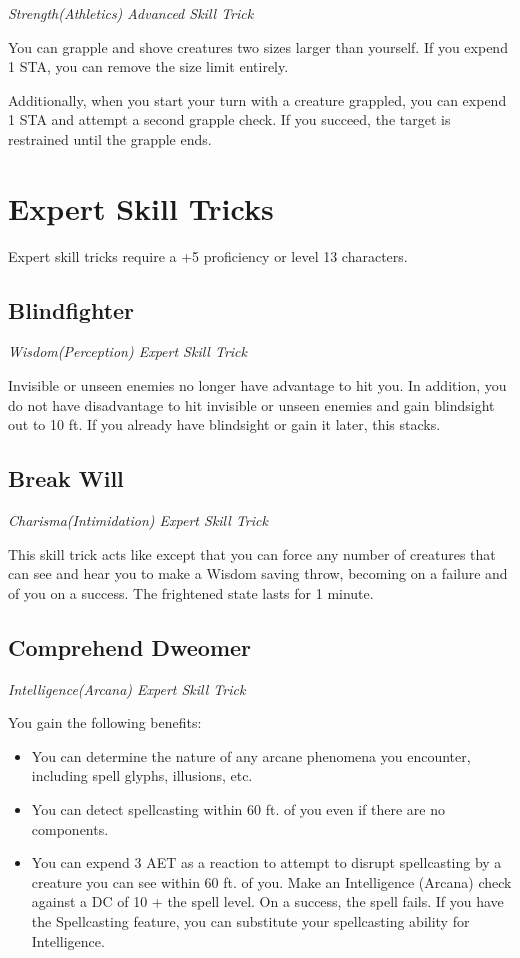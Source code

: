 \textit{Strength(Athletics) Advanced Skill Trick}

You can grapple and shove creatures two sizes larger than yourself. If you expend 1 STA, you can remove the size limit entirely.

Additionally, when you start your turn with a creature grappled, you can expend 1 STA and attempt a second grapple check. If you succeed, the target is restrained until the grapple ends.

\section{Expert Skill Tricks}
\label{sec:skill-tricks-expert}

Expert skill tricks require a +5 proficiency or level 13 characters.

\subsection{Blindfighter}

\textit{Wisdom(Perception) Expert Skill Trick}

Invisible or unseen enemies no longer have advantage to hit you. In addition, you do not have disadvantage to hit invisible or unseen enemies and gain blindsight out to 10 ft. If you already have blindsight or gain it later, this stacks.

\subsection{Break Will}

\textit{Charisma(Intimidation) Expert Skill Trick}

This skill trick acts like  except that you can force any number of creatures that can see and hear you to make a Wisdom saving throw, becoming  on a failure and  of you on a success. The frightened state lasts for 1 minute.

\subsection{Comprehend Dweomer}

\textit{Intelligence(Arcana) Expert Skill Trick}

You gain the following benefits:
\begin{itemize}
	\item You can determine the nature of any arcane phenomena you encounter, including spell glyphs, illusions, etc.
	\item You can detect spellcasting within 60 ft. of you even if there are no components.
	\item You can expend 3 AET as a reaction to attempt to disrupt spellcasting by a creature you can see within 60 ft. of you. Make an Intelligence (Arcana) check against a DC of 10 + the spell level. On a success, the spell fails. If you have the Spellcasting feature, you can substitute your spellcasting ability for Intelligence.
\end{itemize}

